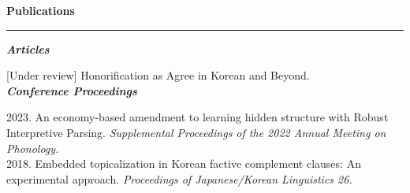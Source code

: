 \documentclass[11pt]{article}
\newcommand{\sect}[1]{{\fontsize{15}{25}\selectfont \textbf{#1}} {\vspace{0.1cm}} \hrule {\vspace{0.3cm}}}
\newcommand{\subsect}[1]{{\fontsize{12}{18}\selectfont \textit{\textbf{#1}}} {\vspace{0.3cm}}}
\begin{document}

{\vspace{1cm}}

{\sect{Publications}}

{\subsect{Articles}}

[Under review] Honorification as Agree in Korean and Beyond.\\

{\subsect{Conference Proceedings}}

{2023. An economy-based amendment to learning hidden structure with Robust Interpretive Parsing. \textit{Supplemental Proceedings of the 2022 Annual Meeting on Phonology.}}\\

{2018. Embedded topicalization in Korean factive complement clauses: An experimental approach. \textit{Proceedings of Japanese/Korean Linguistics 26.}}\\
\end{document}
